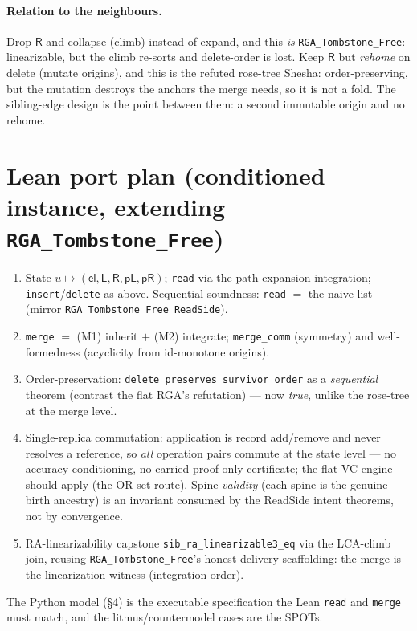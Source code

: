 \documentclass[11pt]{article}
\newcommand{\el}{\mathsf{el}}
\newcommand{\lo}{\mathsf{L}}
\newcommand{\ro}{\mathsf{R}}
\newcommand{\pL}{\mathsf{pL}}
\newcommand{\pR}{\mathsf{pR}}
\begin{document}
\paragraph{Relation to the neighbours.} Drop $\ro$ and collapse (climb) instead
of expand, and this \emph{is} \texttt{RGA\_Tombstone\_Free}: linearizable, but the
climb re-sorts and delete-order is lost. Keep $\ro$ but \emph{rehome} on delete
(mutate origins), and this is the refuted rose-tree Shesha: order-preserving, but
the mutation destroys the anchors the merge needs, so it is not a fold. The
sibling-edge design is the point between them: a second immutable origin and no
rehome.

\section{Lean port plan (conditioned instance, extending \texttt{RGA\_Tombstone\_Free})}

\begin{enumerate}
  \item State $u\mapsto(\el,\lo,\ro,\pL,\pR)$; \texttt{read} via the path-expansion
        integration; \texttt{insert}/\texttt{delete} as above. Sequential soundness:
        \texttt{read} $=$ the naive list (mirror \texttt{RGA\_Tombstone\_Free\_ReadSide}).
  \item \texttt{merge} $=$ (M1) inherit $+$ (M2) integrate; \texttt{merge\_comm}
        (symmetry) and well-formedness (acyclicity from id-monotone origins).
  \item Order-preservation: \texttt{delete\_preserves\_survivor\_order} as a
        \emph{sequential} theorem (contrast the flat RGA's refutation) --- now
        \emph{true}, unlike the rose-tree at the merge level.
  \item Single-replica commutation: application is record add/remove and never
        resolves a reference, so \emph{all} operation pairs commute at the state
        level --- no accuracy conditioning, no carried proof-only certificate;
        the flat VC engine should apply (the OR-set route). Spine
        \emph{validity} (each spine is the genuine birth ancestry) is an
        invariant consumed by the ReadSide intent theorems, not by convergence.
  \item RA-linearizability capstone \texttt{sib\_ra\_linearizable3\_eq} via the
        LCA-climb join, reusing \texttt{RGA\_Tombstone\_Free}'s honest-delivery
        scaffolding: the merge is the linearization witness (integration order).
\end{enumerate}
The Python model (\S4) is the executable specification the Lean \texttt{read} and
\texttt{merge} must match, and the litmus/countermodel cases are the SPOTs.
\end{document}
